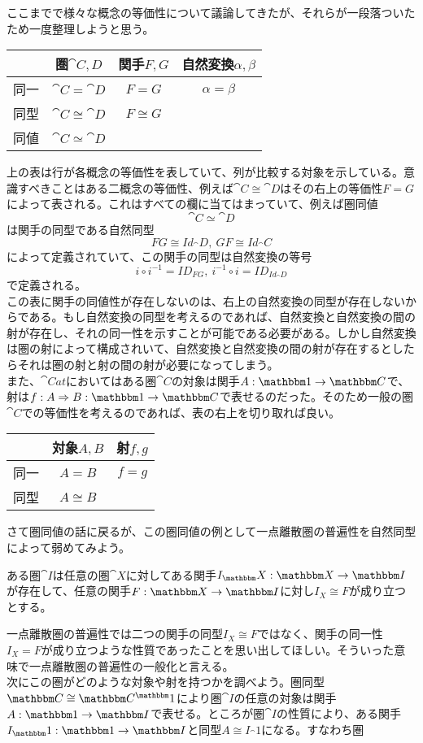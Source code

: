   ここまでで様々な概念の等価性について議論してきたが、それらが一段落ついたため一度整理しようと思う。
  \begin{table}[htb]
    \centering
      \begin{tabular}{|c||c|c|c|}  \hline
      &圏$\cat{C,D}$&関手$F,G$&自然変換$\alpha,\beta$\\ \hline \hline
      同一&$\cat{C}=\cat{D}$&$F=G$&$\alpha=\beta$\\ \hline
      同型&$\cat{C}\cong\cat{D}$&$F\cong G$&\\ \hline
      同値&$\cat{C}\simeq\cat{D}$&&\\ \hline
    \end{tabular}
  \end{table}
  上の表は行が各概念の等価性を表していて、列が比較する対象を示している。意識すべきことはある二概念の等価性、例えば$\cat{C}\cong \cat{D}$はその右上の等価性$F=G$によって表される。これはすべての欄に当てはまっていて、例えば圏同値\[\cat{C}\simeq\cat{D}\]は関手の同型である自然同型\[FG\cong Id_\cat{D},\ GF\cong Id_\cat{C}\]によって定義されていて、この関手の同型は自然変換の等号\[i\circ i^{-1}=ID_{FG},\ i^{-1}\circ i=ID_{Id_\cat{D}}\]で定義される。\\
  この表に関手の同値性が存在しないのは、右上の自然変換の同型が存在しないからである。もし自然変換の同型を考えるのであれば、自然変換と自然変換の間の射が存在し、それの同一性を示すことが可能である必要がある。しかし自然変換は圏の射によって構成されいて、自然変換と自然変換の間の射が存在するとしたらそれは圏の射と射の間の射が必要になってしまう。\\
  また、$\cat{Cat}$においてはある圏$\cat{C}$の対象は関手$\functor{A}{1}{C}$で、射は$\natf{f}{A}{B}{1}{C}$で表せるのだった。そのため一般の圏$\cat{C}$での等価性を考えるのであれば、表の右上を切り取れば良い。
  \begin{table}[htb]
    \centering
      \begin{tabular}{|c||c|c|}  \hline
      &対象$A,B$&射$f,g$\\ \hline \hline
      同一&$A=B$&$f=g$\\ \hline
      同型&$A\cong B$&\\ \hline
    \end{tabular}
  \end{table}

  さて圏同値の話に戻るが、この圏同値の例として一点離散圏の普遍性を自然同型によって弱めてみよう。
  \begin{define}
    ある圏$\cat{I}$は任意の圏$\cat{X}$に対してある関手$\functor{I_\cat{X}}{X}{I}$が存在して、任意の関手$\functor{F}{X}{I}$に対し$I_X\cong F$が成り立つとする。
  \end{define}
  一点離散圏の普遍性では二つの関手の同型$I_X\cong F$ではなく、関手の同一性$I_X=F$が成り立つような性質であったことを思い出してほしい。そういった意味で一点離散圏の普遍性の一般化と言える。\\
  次にこの圏がどのような対象や射を持つかを調べよう。圏同型$\cat{C}\cong\funccat{1}{C}$により圏$\cat{I}$の任意の対象は関手$\functor{A}{1}{I}$で表せる。ところが圏$\cat{I}$の性質により、ある関手$\functor{I_\cat{1}}{1}{I}$と同型$A\cong I_\cat{1}$になる。すなわち圏
